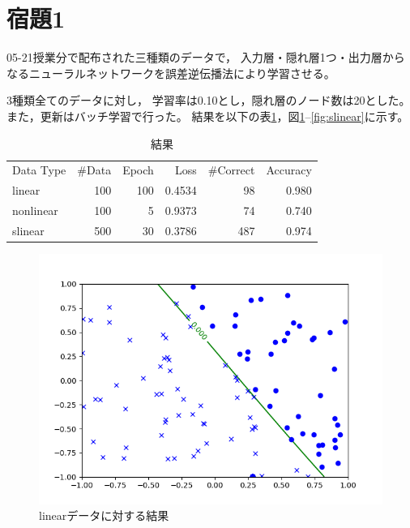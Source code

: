 \documentclass[class=jsarticle, crop=false, dvipdfmx, fleqn]{standalone}
\begin{document}
\section*{宿題1}

05-21授業分で配布された三種類のデータで，
入力層・隠れ層1つ・出力層からなるニューラルネットワークを誤差逆伝播法により学習させる。

3種類全てのデータに対し，
学習率は0.10とし，隠れ層のノード数は20とした。
また，更新はバッチ学習で行った。
結果を以下の表\ref{tab:result}，図\ref{fig:linear}--\ref{fig:slinear}に示す。


\begin{table}[H]
    \centering
    \caption{結果}
    \begin{tabular}{lrrrrr}
        Data Type & {\#}Data & Epoch & Loss & {\#}Correct & Accuracy \\
        linear & 100 & 100 & 0.4534 & 98 & 0.980 \\
        nonlinear & 100 & 5 & 0.9373 & 74 & 0.740 \\
        slinear & 500 & 30 & 0.3786 & 487 & 0.974
    \end{tabular}
    \label{tab:result}
\end{table}

\begin{figure}[H]
    \centering
    \includegraphics[clip, width=12cm]{../figures/assignment1_1_linear_result}
    \caption{linearデータに対する結果}
    \label{fig:linear}
\end{figure}
\end{document}
